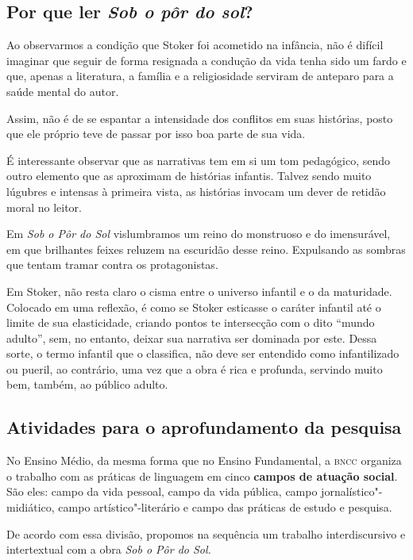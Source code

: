 \documentclass[12pt]{extarticle}
\begin{document}
\subsection{Por que ler \textit{Sob o pôr do sol}?}

Ao observarmos a condição que Stoker foi acometido na infância, não é
difícil imaginar que seguir de forma resignada a condução da vida tenha
sido um fardo e que, apenas a literatura, a família e a religiosidade
serviram de anteparo para a saúde mental do autor.

Assim, não é de se espantar a intensidade dos conflitos em suas
histórias, posto que ele próprio teve de passar por isso boa parte de
sua vida.

É interessante observar que as narrativas tem em si um tom pedagógico,
sendo outro elemento que as aproximam de histórias infantis. Talvez
sendo muito lúgubres e intensas à primeira vista, as histórias invocam
um dever de retidão moral no leitor.

Em \emph{Sob o Pôr do Sol} vislumbramos um reino do monstruoso e do
imensurável, em que brilhantes feixes reluzem na escuridão desse reino.
Expulsando as sombras que tentam tramar contra os protagonistas.

Em Stoker, não resta claro o cisma entre o universo infantil e o da
maturidade. Colocado em uma reflexão, é como se Stoker esticasse o
caráter infantil até o limite de sua elasticidade, criando pontos te
intersecção com o dito ``mundo adulto'', sem, no entanto, deixar sua
narrativa ser dominada por este. Dessa sorte, o termo infantil que o
classifica, não deve ser entendido como infantilizado ou pueril, ao
contrário, uma vez que a obra é rica e profunda, servindo muito bem,
também, ao público adulto.

\subsection{Atividades para o aprofundamento da pesquisa}


No Ensino Médio, da mesma forma que no Ensino Fundamental, a \textsc{bncc}
organiza o trabalho com as práticas de linguagem em cinco \textbf{campos
de atuação social}. São eles: campo da vida pessoal, campo da vida
pública, campo jornalístico"-midiático, campo artístico"-literário e campo
das práticas de estudo e pesquisa.

De acordo com essa divisão, propomos na sequência um trabalho
interdiscursivo e intertextual com a obra \emph{Sob o Pôr do Sol.}
\end{document}
